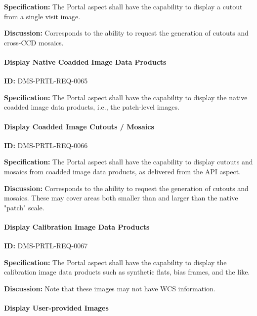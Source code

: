 \documentclass[SE,toc]{lsstdoc}
\begin{document}
\textbf{Specification:}
The Portal aspect shall have the capability to display a cutout from a single visit image.

\textbf{Discussion:}
Corresponds to the ability to request the generation of cutouts and cross-CCD mosaics.

\paragraph{Display Native Coadded Image Data Products}\hfill  %

\label{DMS-PRTL-REQ-0065}
\textbf{ID:} DMS-PRTL-REQ-0065

\textbf{Specification:}
The Portal aspect shall have the capability to display the native coadded image data products, i.e., the patch-level images.

\paragraph{Display Coadded Image Cutouts / Mosaics}\hfill  %

\label{DMS-PRTL-REQ-0066}
\textbf{ID:} DMS-PRTL-REQ-0066

\textbf{Specification:}
The Portal aspect shall have the capability to display cutouts and mosaics from coadded image data products, as delivered from the API aspect.

\textbf{Discussion:}
Corresponds to the ability to request the generation of cutouts and mosaics.  These may cover areas both smaller than and larger than the native "patch" scale.

\paragraph{Display Calibration Image Data Products}\hfill  %

\label{DMS-PRTL-REQ-0067}
\textbf{ID:} DMS-PRTL-REQ-0067

\textbf{Specification:}
The Portal aspect shall have the capability to display the calibration image data products such as synthetic flats, bias frames, and the like.

\textbf{Discussion:}
Note that these images may not have WCS information.

\paragraph{Display User-provided Images}\hfill  %
\end{document}
